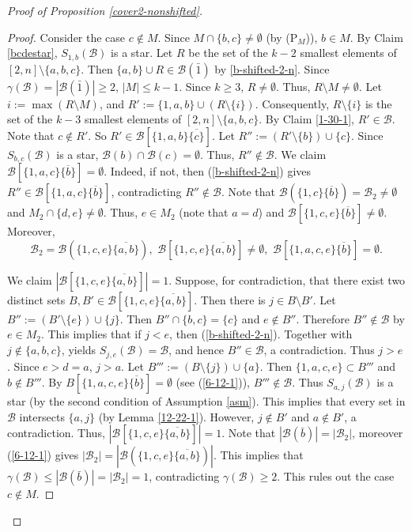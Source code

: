 \documentclass[a4paper,11pt]{article}
\newcommand{\m}{\mathcal}
\begin{document}
\begin{proof}[Proof of Proposition \ref{cover2-nonshifted}]
\begin{proof}
Consider the case $c\not\in M$. Since $M\cap \{b,c\}\ne \emptyset$ (by (P$_M$)), $b\in M$.
By Claim \ref{bcdestar}, $S_{1,b}(\m B)$ is a star. 
Let $R$ be the set of the $k-2$ smallest elements of $[2,n]\setminus \{a,b,c\}$. Then $\{a,b\}\cup R\in \m B(\bar1)$ by \eqref{b-shifted-2-n}. 
Since $\gamma(\m B)=|\m B(\bar1)|\ge 2$, $|M|\le k-1$.
Since $k\ge 3$, $R\ne\emptyset$. Thus, $R\setminus M\ne \emptyset$. Let $i:=\max (R\setminus M)$, and $R':=\{1,a,b\}\cup (R\setminus \{i\})$.
Consequently, $R\setminus\{i\}$ is the set of the $k-3$ smallest elements of $[2,n]\setminus \{a,b,c\}$.
By Claim \ref{1-30-1}, $R'\in \m B$. Note that $c\not\in R'$. So $R'\in \m B[\{1,a,b\}\overline{\{c\}}]$. Let $R'':=(R'\setminus \{b\}) \cup \{c\}$. Since $S_{b,c}(\m B)$ is a star, $\m B(b)\cap \m B(c)=\emptyset$. Thus, $R''\not\in \m B$.
We claim $\m B[\{1,a,c\}\overline{\{b\}}]=\emptyset$. Indeed, if not, then (\ref{b-shifted-2-n}) gives $R''\in \m B[\{1,a,c\}\overline{\{b\}}]$, contradicting $R''\not\in \m B$.
Note that $\m B(\{1,c\}\overline{\{b\}})=\m B_2\ne \emptyset$ and $M_2\cap \{d,e\}\ne \emptyset$. Thus, $e\in M_2$ (note that $a=d$) and 
$\m B[\{1,c,e\}\overline{\{b\}}]\ne \emptyset$. Moreover,  
\begin{equation}\label{6-12-1}
\m B_2=\m B(\{1,c,e\}\overline{\{a, b\}}),\,\,\m B[\{1,c,e\}\overline{\{a,b\}}]\ne \emptyset, \,\,    \m B[\{1,a,c,e\}\overline{\{b\}}]= \emptyset.  
\end{equation}

We claim $|\m B[\{1,c,e\}\overline{\{a,b\}}]|=1$. 
Suppose, for contradiction, that there exist two distinct sets $B, B'\in \m B[\{1,c,e\}\overline{\{a,b\}}]$. Then there is $j\in B\setminus B'$.
Let $B'':=(B'\setminus \{e\})\cup \{j\}$. Then $B''\cap \{b,c\}=\{c\}$ and $e\not\in B''$. Therefore $B''\not\in \m B$ by $e\in M_2$. This implies that if $j<e$, then (\ref{b-shifted-2-n}). Together with $j\not\in \{a,b,c\}$, yields $S_{j,e}(\m B)=\m B$, and hence  $B''\in \m B$, a contradiction. Thus $j>e$. Since $e>d=a$, $j>a$. 
Let $B''':=(B\setminus \{j\})\cup \{a\}$. Then $\{1,a,c,e\}\subset B'''$ and $b\not\in B'''$. 
By $B[\{1,a,c,e\}\overline{\{b\}}]= \emptyset$ (see (\ref{6-12-1})), $B'''\not\in \m B$. Thus $S_{a,j}(\m B)$ is a star (by the second condition of Assumption \ref{asm}). 
This implies that every set in $\m B$ intersects $\{a,j\}$ (by Lemma \ref{12-22-1}). However, $j\not\in B'$ and $a\not\in B'$, a contradiction. Thus, $|\m B[\{1,c,e\}\overline{\{a,b\}}]|=1$.
Note that $|\m B(\bar b)|=|\m B_2|$, moreover (\ref{6-12-1}) gives $|\m B_2|=|\m B(\{1,c,e\}\overline{\{a, b\}})|$. This implies that $\gamma(\m B)\le  |\m B(\bar b)|=|\m B_2|=1$, contradicting $\gamma(\m B)\ge 2$. This rules out the case $c\notin M$.


\end{proof}
\end{proof}
\end{document}
